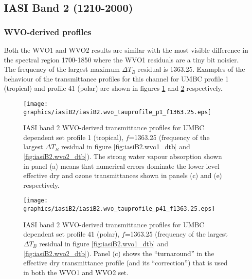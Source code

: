 \subsection{IASI Band 2 (1210-2000\invcm)}

\subsubsection{WVO-derived profiles}
Both the WVO1 and WVO2 results are similar with the most visible difference in the spectral region 1700-1850\invcm{} where the WVO1 residuals are a tiny bit noisier. The frequency of the largest maximum $\Delta T_{B}$ residual is 1363.25\invcm. Examples of the behaviour of the transmittance profiles for this channel for UMBC profile 1 (tropical) and profile 41 (polar) are shown in figures \ref{fig:iasiB2.wvo_tauprofile_p1_f1363.25} and \ref{fig:iasiB2.wvo_tauprofile_p41_f1363.25} respectively.
\begin{figure}[htp]
  \centering
  \texttt{[image: graphics/iasiB2/iasiB2.wvo\_tauprofile\_p1\_f1363.25.eps]}
  \caption{IASI band 2 WVO-derived transmittance profiles for UMBC dependent set profile 1 (tropical), $f$=1363.25\invcm{} (frequency of the largest $\Delta T_{B}$ residual in figure \ref{fig:iasiB2.wvo1_dtb} and \ref{fig:iasiB2.wvo2_dtb}). The strong water vapour absorption shown in panel (a) means that numerical errors dominate the lower level effective dry and ozone transmittances shown in panels (c) and (e) respectively.}
  \label{fig:iasiB2.wvo_tauprofile_p1_f1363.25}
\end{figure}
\begin{figure}[htp]
  \centering
  \texttt{[image: graphics/iasiB2/iasiB2.wvo\_tauprofile\_p41\_f1363.25.eps]}
  \caption{IASI band 2 WVO-derived transmittance profiles for UMBC dependent set profile 41 (polar), $f$=1363.25\invcm{} (frequency of the largest $\Delta T_{B}$ residual in figure \ref{fig:iasiB2.wvo1_dtb} and \ref{fig:iasiB2.wvo2_dtb}). Panel (c) shows the ``turnaround'' in the effective dry transmittance profile (and its ``correction'') that is used in both the WVO1 and WVO2 set.}
  \label{fig:iasiB2.wvo_tauprofile_p41_f1363.25}
\end{figure}


